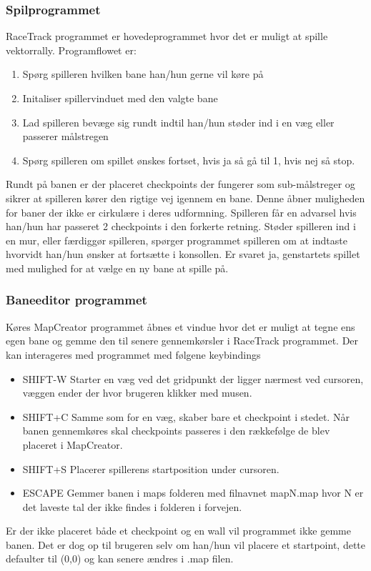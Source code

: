 \subsubsection{Spilprogrammet}
RaceTrack programmet er hovedeprogrammet hvor det er muligt at spille vektorrally. Programflowet er:
\begin{enumerate}
\item Spørg spilleren hvilken bane han/hun gerne vil køre på
\item Initaliser spillervinduet med den valgte bane 
\item Lad spilleren bevæge sig rundt indtil han/hun støder ind i en væg eller passerer målstregen
\item Spørg spilleren om spillet ønskes fortset, hvis ja så gå til 1, hvis nej så stop.
\end{enumerate}
Rundt på banen er der placeret checkpoints der fungerer som sub-målstreger og sikrer at spilleren kører den rigtige vej igennem en bane. Denne åbner muligheden for baner der ikke er cirkulære i deres udformning. Spilleren får en advarsel hvis han/hun har passeret 2 checkpoints i den forkerte retning.
Støder spilleren ind i en mur, eller færdiggør spilleren, spørger programmet spilleren om at indtaste hvorvidt han/hun ønsker at fortsætte i konsollen. Er svaret ja, genstartets spillet med mulighed for at vælge en ny bane at spille på.

\subsubsection{Baneeditor programmet}
Køres MapCreator programmet åbnes et vindue hvor det er muligt at tegne ens egen bane og gemme den til senere gennemkørsler i RaceTrack programmet.
Der kan interageres med programmet med følgene keybindings
\begin{itemize}
\item SHIFT-W Starter en væg ved det gridpunkt der ligger nærmest ved cursoren, væggen ender der hvor brugeren klikker med musen.
\item SHIFT+C Samme som for en væg, skaber bare et checkpoint i stedet. Når banen gennemkøres skal checkpoints passeres i den rækkefølge de blev placeret i MapCreator.
\item SHIFT+S Placerer spillerens startposition under cursoren.
\item ESCAPE Gemmer banen i maps folderen med filnavnet mapN.map hvor N er det laveste tal der ikke findes i folderen i forvejen.
\end{itemize}
Er der ikke placeret både et checkpoint og en wall vil programmet ikke gemme banen. Det er dog op til brugeren selv om han/hun vil placere et startpoint, dette defaulter til (0,0) og kan senere ændres i .map filen.
